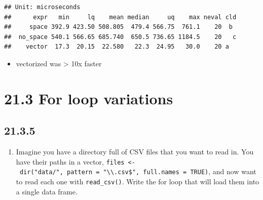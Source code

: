 \documentclass[]{book}
\providecommand{\tightlist}{%
  \setlength{\itemsep}{0pt}\setlength{\parskip}{0pt}}
\theoremstyle{definition}
\theoremstyle{definition}
\theoremstyle{definition}
\theoremstyle{remark}
\begin{document}
\begin{enumerate}
\begin{verbatim}
## Unit: microseconds
##      expr   min     lq    mean median     uq    max neval cld
##     space 392.9 423.50 508.805  479.4 566.75  761.1    20  b 
##  no_space 540.1 566.65 685.740  650.5 736.65 1184.5    20   c
##    vector  17.3  20.15  22.580   22.3  24.95   30.0    20 a
\end{verbatim}

  \begin{itemize}
  \tightlist
  \item
    vectorized was \textgreater{} 10x faster
  \end{itemize}
\end{enumerate}

\hypertarget{for-loop-variations}{%
\section{21.3 For loop variations}\label{for-loop-variations}}

\hypertarget{section-73}{%
\subsection{21.3.5}\label{section-73}}

\begin{enumerate}
\def\labelenumi{\arabic{enumi}.}
\tightlist
\item
  Imagine you have a directory full of CSV files that you want to read
  in. You have their paths in a vector,
  \texttt{files\ \textless{}-\ dir("data/",\ pattern\ =\ "\textbackslash{}\textbackslash{}.csv\$",\ full.names\ =\ TRUE)},
  and now want to read each one with \texttt{read\_csv()}. Write the for
  loop that will load them into a single data frame.
\end{enumerate}
\end{document}
